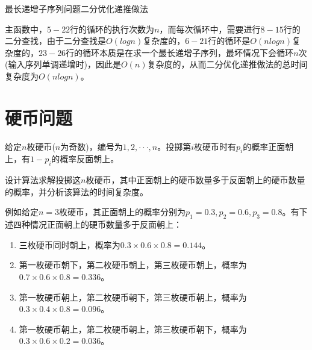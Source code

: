 \documentclass{article}
\begin{document}
\begin{algorithm}[H]

\caption{最长递增子序列问题二分优化递推做法}
\LinesNumbered
{}


\end{algorithm}

主函数中，$5-22$行的循环的执行次数为$n$，而每次循环中，需要进行$8-15$行的二分查找，由于二分查找是$O(log n)$复杂度的，$6-21$行的循环是$O(n log n)$复杂度的，$23-26$行的循环本质是在求一个最长递增子序列，最坏情况下会循环$n$次(输入序列单调递增时)，因此是$O(n)$复杂度的，从而二分优化递推做法的总时间复杂度为$O(n log n)$。

\section{硬币问题}

给定$n$枚硬币($n$为奇数)，编号为$1,2,···,n$。投掷第$i$枚硬币时有$p_i$的概率正面朝上，有$1−p_i$的概率反面朝上。

设计算法求解投掷这$n$枚硬币，其中正面朝上的硬币数量多于反面朝上的硬币数量的概率，并分析该算法的时间复杂度。

例如给定$n=3$枚硬币，其正面朝上的概率分别为$p_1=0.3,p_2=0.6,p_3=0.8$。有下述四种情况正面朝上的硬币数量多于反面朝上：

\begin{enumerate}[itemindent=3em]
    \item 三枚硬币同时朝上，概率为$0.3\times0.6\times0.8=0.144$。
    \item 第一枚硬币朝下，第二枚硬币朝上，第三枚硬币朝上，概率为$0.7\times0.6\times0.8=0.336$。
    \item 第一枚硬币朝上，第二枚硬币朝下，第三枚硬币朝上，概率为$0.3\times0.4\times0.8=0.096$。
    \item 第一枚硬币朝上，第二枚硬币朝上，第三枚硬币朝下，概率为$0.3\times0.6\times0.2=0.036$。
\end{enumerate}
\end{document}
